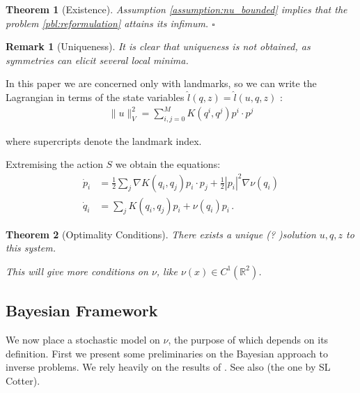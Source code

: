 \documentclass{article}
\newtheorem{theorem}{Theorem}
\newtheorem{remark}{Remark}
\newcommand{\norm}[2]{\| #1 \|_{ #2 }}
\newcommand{\vnorm}[1]{\norm{ #1 }{V}}
\newcommand{\RdM}{\mathbb{R}^{d\times M}}
\begin{document}
\begin{theorem}[Existence]
Assumption \ref{assumption:nu_bounded} implies that the problem
\eqref{pbl:reformulation} attains its infimum.
{\hfill $\square$}
\end{theorem}

\begin{remark}[Uniqueness]
It is clear that uniqueness is not obtained, as symmetries can elicit several
local minima.
\end{remark}

In this paper we are concerned only with
landmarks, so we can write the Lagrangian in terms of the state variables $\hat
l(q, z) = \hat l(u, q, z)$ \cite{younes2010shapes}:
\begin{align*}
\vnorm{u}^2 = \sum_{i,j=0}^M K(q^i,q^j) p^i \cdot p^j
\end{align*}

where supercripts denote the landmark index. 

Extremising the action $S$ we obtain the equations: 
\begin{align}\label{pq:optimality}
\dot p_i & =\frac12 \sum_j \nabla K(q_i,q_j)p_i\cdot p_j  + \frac12 |p_i|^2 \nabla \nu(q_i)\\
\dot q_i & = \sum_j K(q_i,q_j)p_i + \nu(q_i)p_i\, . 
\end{align}

\begin{theorem}[Optimality Conditions]
There exists a unique (? )solution $u, q, z$ to this system.

This will give more conditions on $\nu$, like $\nu(x) \in C^{1}(\mathbb R^2)$. 
\end{theorem}

\subsection{Bayesian Framework}\label{sec:bayesian}

We now place a stochastic model on $\nu$, the purpose of which depends on its
definition. First we present some preliminaries on the Bayesian approach to
inverse problems. We rely heavily on the results of \cite{dashti2017bayesian}.
See also (the one by SL Cotter).\\
\end{document}
